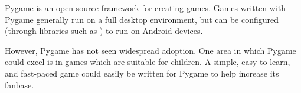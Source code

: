 
Pygame is an open-source framework for creating games.  Games written
with Pygame generally run on a full desktop environment, but can be
configured (through libraries such as ) to run on Android
devices.

However, Pygame has not seen widespread adoption.  One area in which
Pygame could excel is in games which are suitable for children.  A simple,
easy-to-learn, and fast-paced game could easily be written for Pygame
to help increase its fanbase.
